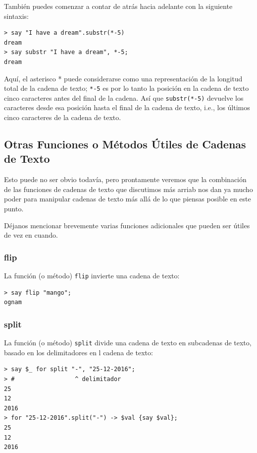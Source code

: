 También puedes comenzar a contar de atrás hacia adelante con la
siguiente sintaxis:

\begin{verbatim}
> say "I have a dream".substr(*-5)
dream
> say substr "I have a dream", *-5;
dream
\end{verbatim}
%
Aquí, el asterisco * puede considerarse como una representación de la
longitud total de la cadena de texto; \verb|*-5| es por lo tanto la posición
en la cadena de texto cinco caracteres antes del final de la cadena. Así que
\verb|substr(*-5)| devuelve los caracteres desde esa posición hasta el final
de la cadena de texto, i.e., los últimos cinco caracteres de la cadena de
texto.

\subsection{Otras Funciones o Métodos Útiles de Cadenas de Texto}

Esto puede no ser obvio todavía, pero prontamente veremos
que la combinación de las funciones de cadenas de texto que discutimos
más arriab nos dan ya mucho poder para manipular cadenas de texto
más allá de lo que piensas posible en este punto.

Déjanos mencionar brevemente varias funciones adicionales
que pueden ser útiles de vez en cuando.

\subsubsection{flip}

La función (o método) {\tt flip} invierte una cadena de texto:

\begin{verbatim}
> say flip "mango";
ognam
\end{verbatim}
%

\subsubsection{split}
La función (o método) {\tt split} divide una cadena de texto 
en subcadenas de texto, basado en los delimitadores en l
cadena de texto:

\begin{verbatim}
> say $_ for split "-", "25-12-2016";
> #                 ^ delimitador
25
12
2016
> for "25-12-2016".split("-") -> $val {say $val};
25
12
2016
\end{verbatim}

